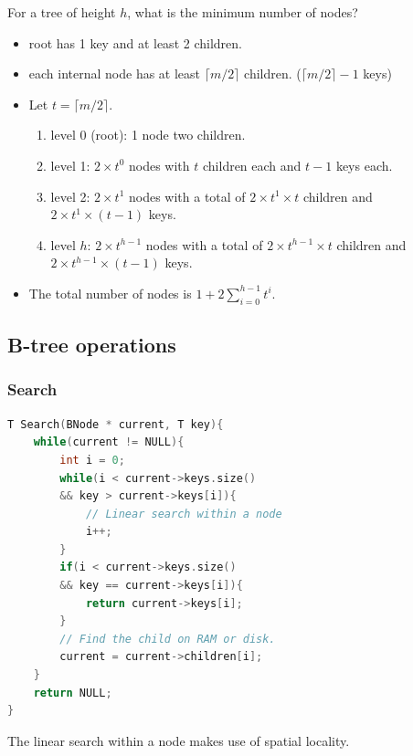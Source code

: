 \documentclass[letterpaper,12pt]{article}
\begin{document}
For a tree of height $h$, what is the minimum number of nodes? \begin{itemize}
    \item root has 1 key and at least 2 children.
    \item each internal node has at least $\lceil m/2 \rceil$ children. ($\lceil m/2 \rceil- 1$ keys)
    \item Let $t = \lceil m/2 \rceil$.\begin{enumerate}
        \item level 0 (root): 1 node two children.
        \item level 1: $2\times t^0$ nodes with $t$ children each and $t-1$ keys each.
        \item level 2: $2\times t^1$ nodes with a total of $2\times t^1 \times t$ children and $2\times t^1 \times (t-1)$ keys.
        \item level $h$: $2\times t^{h-1}$ nodes with a total of $2\times t^{h-1} \times t$ children and $2\times t^{h-1} \times (t-1)$ keys.
    \end{enumerate}
    \item The total number of nodes is $1 + 2\sum_{i=0}^{h-1} t^i$.
\end{itemize}
\subsection{B-tree operations}
\subsubsection{Search}
\begin{algorithmic}
\end{algorithmic}
\begin{lstlisting}[language=C++]
T Search(BNode * current, T key){
    while(current != NULL){
        int i = 0;
        while(i < current->keys.size() 
        && key > current->keys[i]){
            // Linear search within a node
            i++;
        }
        if(i < current->keys.size() 
        && key == current->keys[i]){
            return current->keys[i];
        }
        // Find the child on RAM or disk.
        current = current->children[i];
    }
    return NULL;
}
\end{lstlisting}
The linear search within a node makes use of spatial locality. 
\end{document}
